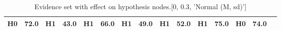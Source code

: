 \begin{table}
\begin{tabular}{c|cc|cc|cc|cc|cc|cc|cc}
\cellcolor{Bittersweet}H0&\cellcolor{Bittersweet}72.0&\cellcolor{Bittersweet}H1&\cellcolor{Bittersweet}43.0&\cellcolor{Bittersweet}H1&\cellcolor{Bittersweet}66.0&\cellcolor{Bittersweet}H1&\cellcolor{Bittersweet}49.0&\cellcolor{Bittersweet}H1&\cellcolor{Bittersweet}52.0&\cellcolor{Bittersweet}H1&\cellcolor{Bittersweet}75.0&\cellcolor{Bittersweet}H0&\cellcolor{Bittersweet}74.0\\\bottomrule\end{tabular}\caption{Evidence set with effect on hypothesis nodes.[0, 0.3, 'Normal (M, sd)']}\end{table}